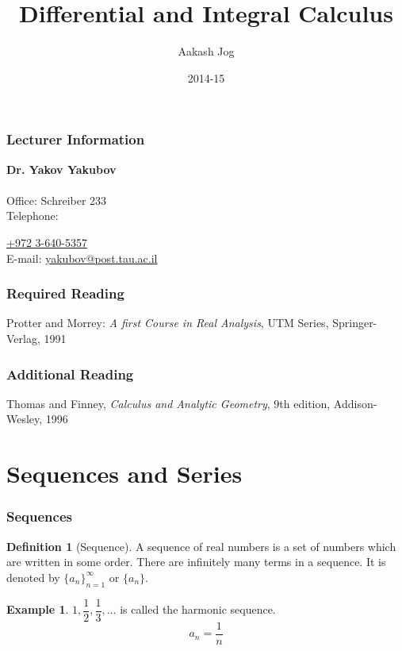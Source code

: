 \documentclass[fleqn, a4paper, 12pt, twoside]{article}
\title{Differential and Integral Calculus}
\author{Aakash Jog}
\date{2014-15}
\theoremstyle{definition}
\newtheorem{example}{Example}
\newtheorem{definition}{Definition}
\theoremstyle{theorem}
\begin{document}
\maketitle

\tableofcontents

\newpage
\section{Lecturer Information}

\textbf{Dr. Yakov Yakubov}\\
~\\
Office: Schreiber 233\\
Telephone: {\href{tel:+97236405357}{+972 3-640-5357}\\
E-mail: \href{mailto:yakubov@post.tau.ac.il}{yakubov@post.tau.ac.il}\\

\section{Required Reading}

Protter and Morrey: \textit{A first Course in Real Analysis}, UTM Series, Springer-Verlag, 1991

\section{Additional Reading}

Thomas and Finney, \textit{Calculus and Analytic Geometry}, 9th edition, Addison-Wesley, 1996

\newpage
\part{Sequences and Series}

\section{Sequences}

\begin{definition}[Sequence]
	A sequence of real numbers is a set of numbers which are written in some order. There are infinitely many terms in a sequence. It is denoted by $\{a_n\}_{n = 1}^{\infty}$ or $\{a_n\}$.
\end{definition}

\begin{example}
	$1, \dfrac{1}{2}, \dfrac{1}{3}, \dots$ is called the harmonic sequence.
	\begin{equation*}
		a_n = \dfrac{1}{n}
	\end{equation*}
\end{example}

}
\end{document}
